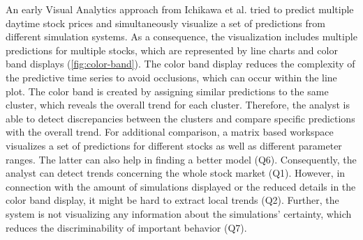 \documentclass[electronic]{vgtc}             %
\begin{document}
An early Visual Analytics approach from Ichikawa et al. \cite{ichikawa:2002} tried to predict multiple daytime stock prices and simultaneously visualize a set of predictions from different simulation systems. 
As a consequence, the visualization includes multiple predictions for multiple stocks, which are represented by line charts and color band displays (\autoref{fig:color-band}).
The color band display reduces the complexity of the predictive time series to avoid occlusions, which can occur within the line plot. 
The color band is created by assigning similar predictions to the same cluster, which reveals the overall trend for each cluster.
Therefore, the analyst is able to detect discrepancies between the clusters and compare specific predictions with the overall trend. 
For additional comparison, a matrix based workspace visualizes a set of predictions for different stocks as well as different parameter ranges. 
The latter can also help in finding a better model (Q6).
Consequently, the analyst can detect trends concerning the whole stock market (Q1).  
However, in connection with the amount of simulations displayed or the reduced details in the color band display, it might be hard to extract local trends (Q2).
Further, the system is not visualizing any information about the simulations' certainty, which reduces the discriminability of important behavior (Q7). 
\end{document}
